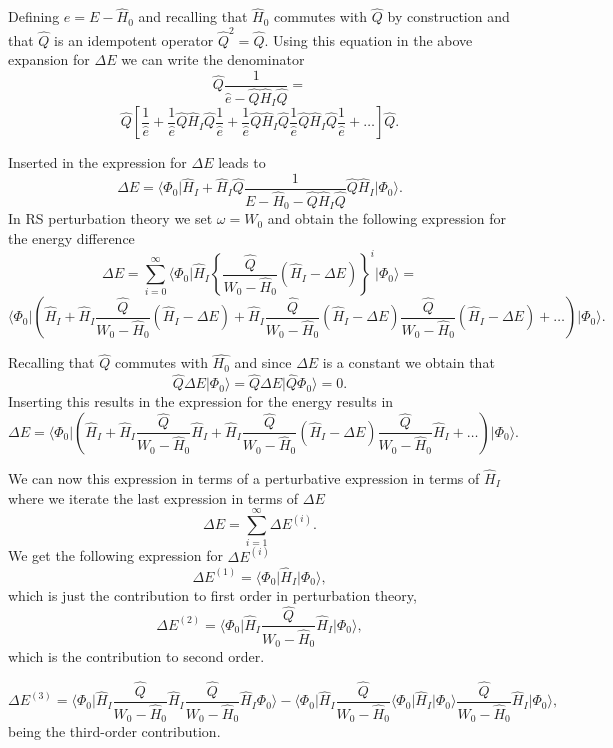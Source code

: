 \documentclass[graybox,sectrefs,envcountresetchap,open=right]{svmonodo}
\begin{document}
Defining $e=E-\hat{H}_0$ and recalling that $\hat{H}_0$ commutes with 
$\hat{Q}$ by construction and that $\hat{Q}$ is an idempotent operator
$\hat{Q}^2=\hat{Q}$. 
Using this equation in the above expansion for $\Delta E$ we can write the denominator 
\[
\hat{Q}\frac{1}{\hat{e}-\hat{Q}\hat{H}_I\hat{Q}}=
\]
\[
\hat{Q}\left[\frac{1}{\hat{e}}+\frac{1}{\hat{e}}\hat{Q}\hat{H}_I\hat{Q}
\frac{1}{\hat{e}}+\frac{1}{\hat{e}}\hat{Q}\hat{H}_I\hat{Q}
\frac{1}{\hat{e}}\hat{Q}\hat{H}_I\hat{Q}\frac{1}{\hat{e}}+\dots\right]\hat{Q}.
\]

Inserted in the expression for $\Delta E$ leads to 
\[
\Delta E=
\langle \Phi_0\vert \hat{H}_I+\hat{H}_I\hat{Q}\frac{1}{E-\hat{H}_0-\hat{Q}\hat{H}_I\hat{Q}}\hat{Q}\hat{H}_I\vert \Phi_0\rangle. 
\]
In RS perturbation theory we set $\omega = W_0$ and obtain the following expression for the energy difference
\[
\Delta E=\sum_{i=0}^{\infty}\langle \Phi_0\vert \hat{H}_I\left\{\frac{\hat{Q}}{W_0-\hat{H}_0}\left(\hat{H}_I-\Delta E\right)\right\}^i\vert \Phi_0\rangle=
\]
\[
\langle \Phi_0\vert \left(\hat{H}_I+\hat{H}_I\frac{\hat{Q}}{W_0-\hat{H}_0}(\hat{H}_I-\Delta E)+
\hat{H}_I\frac{\hat{Q}}{W_0-\hat{H}_0}(\hat{H}_I-\Delta E)\frac{\hat{Q}}{W_0-\hat{H}_0}(\hat{H}_I-\Delta E)+\dots\right)\vert \Phi_0\rangle.
\]



Recalling that $\hat{Q}$ commutes with $\hat{H_0}$ and since $\Delta E$ is a constant we obtain that
\[
\hat{Q}\Delta E\vert \Phi_0\rangle = \hat{Q}\Delta E\vert \hat{Q}\Phi_0\rangle = 0.
\]
Inserting this results in the expression for the energy results in
\[
\Delta E=\langle \Phi_0\vert \left(\hat{H}_I+\hat{H}_I\frac{\hat{Q}}{W_0-\hat{H}_0}\hat{H}_I+
\hat{H}_I\frac{\hat{Q}}{W_0-\hat{H}_0}(\hat{H}_I-\Delta E)\frac{\hat{Q}}{W_0-\hat{H}_0}\hat{H}_I+\dots\right)\vert \Phi_0\rangle.
\]



We can now this expression in terms of a perturbative expression in terms
of $\hat{H}_I$ where we iterate the last expression in terms of $\Delta E$
\[
\Delta E=\sum_{i=1}^{\infty}\Delta E^{(i)}.
\]
We get the following expression for $\Delta E^{(i)}$
\[
\Delta E^{(1)}=\langle \Phi_0\vert \hat{H}_I\vert \Phi_0\rangle,
\] 
which is just the contribution to first order in perturbation theory,
\[
\Delta E^{(2)}=\langle\Phi_0\vert \hat{H}_I\frac{\hat{Q}}{W_0-\hat{H}_0}\hat{H}_I\vert \Phi_0\rangle, 
\]
which is the contribution to second order.



\[
\Delta E^{(3)}=\langle \Phi_0\vert \hat{H}_I\frac{\hat{Q}}{W_0-\hat{H}_0}\hat{H}_I\frac{\hat{Q}}{W_0-\hat{H}_0}\hat{H}_I\Phi_0\rangle-
\langle\Phi_0\vert \hat{H}_I\frac{\hat{Q}}{W_0-\hat{H}_0}\langle \Phi_0\vert \hat{H}_I\vert \Phi_0\rangle\frac{\hat{Q}}{W_0-\hat{H}_0}\hat{H}_I\vert \Phi_0\rangle,
\]
being the third-order contribution. 
\end{document}

